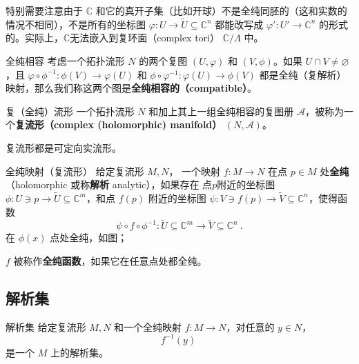 特别需要注意由于 $\mathbb{C}$ 和它的真开子集（比如开球）不是全纯同胚的（这和实数的情况不相同），不是所有的坐标图 $\varphi: U \rightarrow \tilde{U} \subseteq \mathbb{C}^n$ 都能改写成 $\varphi': U' \rightarrow \mathbb{C}^n$ 的形式的。实际上，$\mathbb{C}$无法嵌入到复环面（complex tori） $\mathbb{C} / \Lambda$ 中。

\begin{definition}{全纯相容}
考虑一个拓扑流形 $N$ 的两个复图 $(U, \varphi)$ 和 $(V, \phi)$。如果 $U \cap V \neq \varnothing$，且 $\varphi \circ \phi^{-1}: \phi(V) \rightarrow \varphi(U)$ 和 $\phi \circ \varphi^{-1}: \varphi(U) \rightarrow \phi(V)$ 都是全纯（复解析）映射，那么我们称这两个图是\textbf{全纯相容的（compatible）}。
\end{definition}

\begin{definition}{复（全纯）流形}\label{def_CMani_1}
一个拓扑流形 $N$ 和加上其上一组全纯相容的复图册 $\mathcal{A}$，被称为一个\textbf{复流形（complex (holomorphic) manifold）} $(N, \mathcal{A})$。
\end{definition}

\begin{theorem}{}
复流形都是可定向实流形。
\end{theorem}


\begin{definition}{全纯映射（复流形）}
给定复流形 $M, N$， 一个映射 $f: M \to N$ 在点 $p \in M$ 处\textbf{全纯}（holomorphic 或称\textbf{解析} analytic），如果存在 点$p$附近的坐标图 $\phi: U \ni p \to \tilde{U} \subseteq \mathbb{C}^m$，和点 $f(p)$ 附近的坐标图 $\psi: V \ni f(p) \to \tilde{V} \subseteq \mathbb{C}^n$，使得函数
$$
\psi \circ f \circ \phi^{-1}: \tilde{U} \subseteq \mathbb{C}^m \to \tilde{V} \subseteq \mathbb{C}^n~.
$$
在 $\phi(x)$ 点处全纯，如图；

$f$ 被称作\textbf{全纯函数}，如果它在任意点处都全纯。
\end{definition}



\subsection{解析集}

\begin{definition}{解析集}
给定复流形 $M, N$ 和一个全纯映射 $f: M \to N$，对任意的 $y \in N$，
$$
f^{-1}(y)~
$$
是一个 $M$ 上的解析集。
\end{definition}

